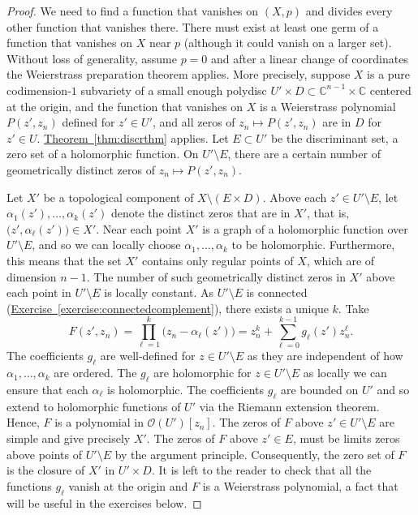\documentclass[12pt,openany]{book}
\newcommand{\C}{{\mathbb{C}}}
\newcommand{\sO}{{\mathscr{O}}}
\theoremstyle{plain}
\theoremstyle{remark}
\theoremstyle{definition}
\theoremstyle{exercise}
\theoremstyle{example}
\newcommand{\exerciseref}[1]{\hyperref[#1]{Exercise~\ref*{#1}}}
\newcommand{\thmref}[1]{\hyperref[#1]{Theorem~\ref*{#1}}}
\begin{document}
\begin{proof}
We need to find a function that vanishes on $(X,p)$
and divides every other function that vanishes there.
There must exist at least one germ of a function that vanishes
on $X$ near $p$
(although it could vanish on a larger set).
Without loss of generality, assume $p=0$
and after a linear change
of coordinates the Weierstrass preparation theorem applies.
More precisely,
suppose $X$ is a pure codimension-$1$ subvariety
of a small enough
polydisc
$U' \times D \subset \C^{n-1} \times \C$ centered at the origin,
and the function that vanishes on $X$ is a
Weierstrass polynomial $P(z',z_n)$ defined for $z' \in U'$, and
all zeros of $z_n \mapsto P(z',z_n)$ are in $D$ for $z' \in U$.
\thmref{thm:discrthm} applies. Let
$E \subset U'$ be the discriminant set, a zero set of a
holomorphic function.
On $U' \setminus E$, there are a certain number of geometrically
distinct zeros of $z_n \mapsto P(z',z_n)$.

Let $X'$ be a topological component of
$X \setminus ( E \times D )$.
Above each $z' \in U' \setminus E$,
let $\alpha_1(z'),\ldots,\alpha_k(z')$
denote the distinct zeros that are in $X'$,
that is, $\bigl(z',\alpha_\ell(z')\bigr) \in X'$.
Near each point $X'$ is a graph of a holomorphic function over
$U' \setminus E$, and so we can locally choose 
$\alpha_1,\ldots,\alpha_k$ to be holomorphic.
Furthermore, this means that the set $X'$ contains only regular points of
$X$, which are of dimension $n-1$.
The number of
such geometrically distinct zeros in $X'$ above each point in
$U' \setminus E$ is locally constant.
As $U' \setminus E$ is connected
(\exerciseref{exercise:connectedcomplement}),
there exists a unique $k$.  Take
\begin{equation*}
F(z',z_n) = \prod_{\ell=1}^k \bigl( z_n-\alpha_\ell(z')\bigr)
=
z_n^k + \sum_{\ell=0}^{k-1} g_\ell(z') z_n^\ell .
\end{equation*}
The coefficients $g_\ell$ are well-defined for $z \in U' \setminus E$
as they are independent of how $\alpha_1,\ldots,\alpha_k$ are ordered.
The $g_\ell$ are holomorphic for $z \in U' \setminus E$
as locally we can ensure that each $\alpha_\ell$ is holomorphic.
The coefficients $g_\ell$ are bounded
on $U'$ and so extend to holomorphic functions of $U'$
via the Riemann extension theorem.
Hence, $F$ is a polynomial
in $\sO(U')[z_n]$.
The zeros of $F$
above $z' \in U' \setminus E$
are simple and give precisely $X'$.
The zeros of $F$ above $z' \in E$, must be
limits zeros above points of $U' \setminus E$
by the argument principle.
Consequently,
the zero set of $F$ is the closure of $X'$ in $U' \times D$.
It is left to the reader to check that
all the functions $g_\ell$ vanish at the origin and $F$ is a Weierstrass
polynomial, a fact that will be useful in the exercises below.


\end{proof}
\end{document}
